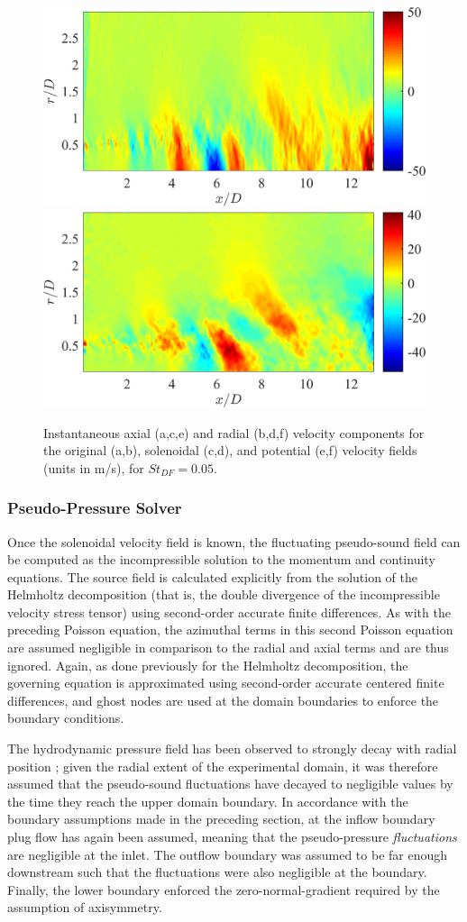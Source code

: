 \begin{figure}
		\includegraphics[width=0.45\linewidth]{Figures/ch5_valid_Inst_potUz.png}
		\includegraphics[width=0.45\linewidth]{Figures/ch5_valid_Inst_potUr.png}
	\caption{Instantaneous axial (a,c,e) and radial (b,d,f) velocity components for the original (a,b), solenoidal (c,d), and potential (e,f) velocity fields (units in m/s), for $St_{DF} = 0.05.$}
	\label{fig:valid_helmholtz}
\end{figure}

\subsubsection{Pseudo-Pressure Solver}
Once the solenoidal velocity field is known, the fluctuating pseudo-sound field can be computed as the incompressible solution to the momentum and continuity equations.
The source field is calculated explicitly from the solution of the Helmholtz decomposition (that is, the double divergence of the incompressible velocity stress tensor) using second-order accurate finite differences.
As with the preceding Poisson equation, the azimuthal terms in this second Poisson equation are assumed negligible in comparison to the radial and axial terms and are thus ignored.
Again, as done previously for the Helmholtz decomposition, the governing equation is approximated using second-order accurate centered finite differences, and ghost nodes are used at the domain boundaries to enforce the boundary conditions.

The hydrodynamic pressure field has been observed to strongly decay with radial position \citep{Arndt1997}; given the radial extent of the experimental domain, it was therefore assumed that the pseudo-sound fluctuations have decayed to negligible values by the time they reach the upper domain boundary.
In accordance with the boundary assumptions made in the preceding section, at the inflow boundary plug flow has again been assumed, meaning that the pseudo-pressure \textit{fluctuations} are negligible at the inlet. 
The outflow boundary was assumed to be far enough downstream such that the fluctuations were also negligible at the boundary.
Finally, the lower boundary enforced the zero-normal-gradient required by the assumption of axisymmetry.

